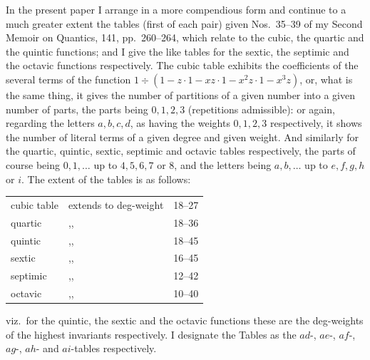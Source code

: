 \documentclass[11pt]{article}
\begin{document}
\noindent In the present paper I arrange in a more compendious form and continue to a much greater extent the tables (first of each pair) given Nos.~35--39 of my Second Memoir on Quantics, 141, pp.~260--264, which relate to the cubic, the quartic and the quintic functions; and I give the like tables for the sextic, the septimic and the octavic functions respectively. The cubic table exhibits the coefficients of the several terms of the function $1 \div (1 - z \cdot 1 - xz \cdot 1 - x^2 z \cdot 1 - x^3 z)$, or, what is the same thing, it gives the number of partitions of a given number into a given number of parts, the parts being $0, 1, 2, 3$ (repetitions admissible): or again, regarding the letters $a, b, c, d$, as having the weights $0, 1, 2, 3$ respectively, it shows the number of literal terms of a given degree and given weight. And similarly for the quartic, quintic, sextic, septimic and octavic tables respectively, the parts of course being $0, 1, \ldots$ up to $4, 5, 6, 7$ or $8$, and the letters being $a, b, \ldots$ up to $e, f, g, h$ or $i$. The extent of the tables is as follows:
\begin{center}
\begin{tabular}{lll}
cubic table & extends to deg-weight & 18--27 \\
quartic     & ,, & 18--36 \\
quintic     & ,, & 18--45 \\
sextic      & ,, & 16--45 \\
septimic    & ,, & 12--42 \\
octavic     & ,, & 10--40
\end{tabular}
\end{center}
viz.\ for the quintic, the sextic and the octavic functions these are the deg-weights of the highest invariants respectively. I designate the Tables as the $ad$-, $ae$-, $af$-, $ag$-, $ah$- and $ai$-tables respectively.
\end{document}

